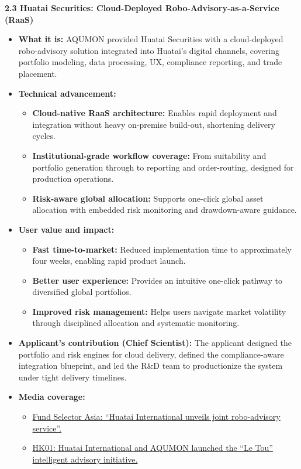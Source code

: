 \documentclass[11pt]{article}
\newcommand{\CVSubsection}[1]{\textbf{#1}\par}
\newenvironment{tightitemize}{%
  \begin{itemize}[leftmargin=*,nosep,topsep=2pt]
}{\end{itemize}}
\begin{document}
\CVSubsection{2.3 Huatai Securities: Cloud-Deployed Robo-Advisory-as-a-Service (RaaS)}

\begin{tightitemize}
  \item \textbf{What it is:} AQUMON provided Huatai Securities with a cloud-deployed robo-advisory solution integrated into Huatai’s digital channels, covering portfolio modeling, data processing, UX, compliance reporting, and trade placement.
  \item \textbf{Technical advancement:}
  \begin{tightitemize}
    \item \textbf{Cloud-native RaaS architecture:} Enables rapid deployment and integration without heavy on-premise build-out, shortening delivery cycles.
    \item \textbf{Institutional-grade workflow coverage:} From suitability and portfolio generation through to reporting and order-routing, designed for production operations.
    \item \textbf{Risk-aware global allocation:} Supports one-click global asset allocation with embedded risk monitoring and drawdown-aware guidance.
  \end{tightitemize}
  \item \textbf{User value and impact:}
  \begin{tightitemize}
    \item \textbf{Fast time-to-market:} Reduced implementation time to approximately four weeks, enabling rapid product launch.
    \item \textbf{Better user experience:} Provides an intuitive one-click pathway to diversified global portfolios.
    \item \textbf{Improved risk management:} Helps users navigate market volatility through disciplined allocation and systematic monitoring.
  \end{tightitemize}
  \item \textbf{Applicant’s contribution (Chief Scientist):} The applicant designed the portfolio and risk engines for cloud delivery, defined the compliance-aware integration blueprint, and led the R\&D team to productionize the system under tight delivery timelines.
  \item \textbf{Media coverage:}
  \begin{tightitemize}
    \item \href{https://fundselectorasia.com/huatai-international-unveils-joint-robo-advisory-service/}{Fund Selector Asia: ``Huatai International unveils joint robo-advisory service''.}
    \item \href{https://www.hk01.com/%E8%B2%A1%E7%B6%93%E5%BF%AB%E8%A8%8A/747614/%E8%8F%AF%E6%B3%B0%E5%9C%8B%E9%9A%9B-%E6%BC%B2%E6%A8%82%E5%85%A8%E7%90%83%E9%80%9A-%E8%88%87aqumon%E5%90%88%E4%BD%9C-%E6%8E%A8%E5%87%BA-%E6%A8%82%E6%8A%95-%E6%99%BA%E8%83%BD%E6%8A%95%E9%A1%A7%E9%A0%85%E7%9B%AE}{HK01: Huatai International and AQUMON launched the ``Le Tou'' intelligent advisory initiative.}
  \end{tightitemize}
\end{tightitemize}
\end{document}
